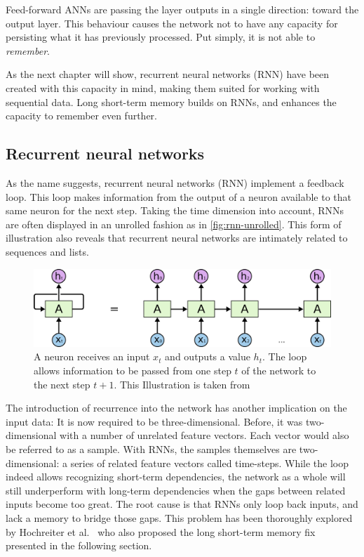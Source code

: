 Feed-forward ANNs are passing the layer outputs in a single direction: toward the output layer. This behaviour causes the network not to have any capacity for persisting what it has previously processed. Put simply, it is not able to \textit{remember}.

As the next chapter will show, recurrent neural networks (RNN) have been created with this capacity in mind, making them suited for working with sequential data. Long short-term memory builds on RNNs, and enhances the capacity to remember even further.

\subsection{Recurrent neural networks}\label{sec:recurrent-networks}
As the name suggests, recurrent neural networks (RNN) implement a feedback loop. This loop makes information from the output of a neuron available to that same neuron for the next step. Taking the time dimension into account, RNNs are often displayed in an unrolled fashion as in \autoref{fig:rnn-unrolled}. This form of illustration also reveals that recurrent neural networks are intimately related to sequences and lists.

\begin{figure}[!htb]
    \centering
    \includegraphics[width=.9\textwidth]{gfx/rnn-unrolled.png}
    \caption[An unrolled RNN neuron]{A neuron receives an input $x_t$ and outputs a value $h_t$. The loop allows information to be passed from one step $t$ of the network to the next step $t+1$. This Illustration is taken from \cite{web:colah}}
    \label{fig:rnn-unrolled}
\end{figure}

The introduction of recurrence into the network has another implication on the input data: It is now required to be three-dimensional. Before, it was two-dimensional with a number of unrelated feature vectors. Each vector would also be referred to as a sample. With RNNs, the samples themselves are two-dimensional: a series of related feature vectors called time-steps.
While the loop indeed allows recognizing short-term dependencies, the network as a whole will still underperform with long-term dependencies when the gaps between related inputs become too great. The root cause is that RNNs only loop back inputs, and lack a memory to bridge those gaps. This problem has been thoroughly explored by Hochreiter et al.~\cite{hochreiter1991untersuchungen} who also proposed the long short-term memory fix presented in the following section.

